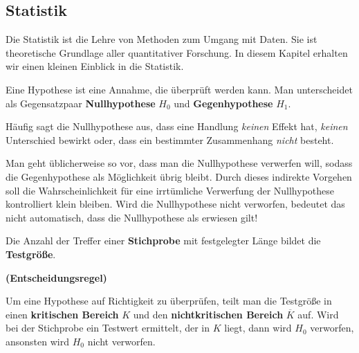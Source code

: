 \documentclass[ngerman, 12pt]{nssheetxea}
\begin{document}
\newpage
\subsection{Statistik}
Die Statistik ist die Lehre von Methoden zum Umgang mit Daten. Sie ist theoretische Grundlage aller quantitativer Forschung. In diesem Kapitel erhalten wir einen kleinen Einblick in die Statistik.

\begin{definition}
Eine Hypothese ist eine Annahme, die überprüft werden kann. Man unterscheidet als Gegensatzpaar \textbf{Nullhypothese} $H_0$ und \textbf{Gegenhypothese} $H_1$. \par
Häufig sagt die Nullhypothese aus, dass eine Handlung \textit{keinen} Effekt hat, \textit{keinen} Unterschied bewirkt oder, dass ein bestimmter Zusammenhang \textit{nicht} besteht.
   
\end{definition} 

Man geht üblicherweise so vor, dass man die Nullhypothese verwerfen will, sodass die Gegenhypothese als Möglichkeit übrig bleibt. Durch dieses indirekte Vorgehen soll die Wahrscheinlichkeit für eine irrtümliche Verwerfung der Nullhypothese kontrolliert klein bleiben. Wird die Nullhypothese nicht verworfen, bedeutet das nicht automatisch, dass die Nullhypothese als erwiesen gilt! 

\begin{definition}
Die Anzahl der Treffer einer \textbf{Stichprobe} mit festgelegter Länge bildet die \textbf{Testgröße}. 
\end{definition}

\begin{theorem} \textbf{(Entscheidungsregel)} \par
Um eine Hypothese auf Richtigkeit zu überprüfen, teilt man die Testgröße in einen \textbf{kritischen Bereich} $K$ und den \textbf{nichtkritischen Bereich} $\overline{K}$ auf. Wird bei der Stichprobe ein Testwert ermittelt, der in $K$ liegt, dann wird $H_0$ verworfen, ansonsten wird $H_0$ nicht verworfen.
\end{theorem}
\end{document}
